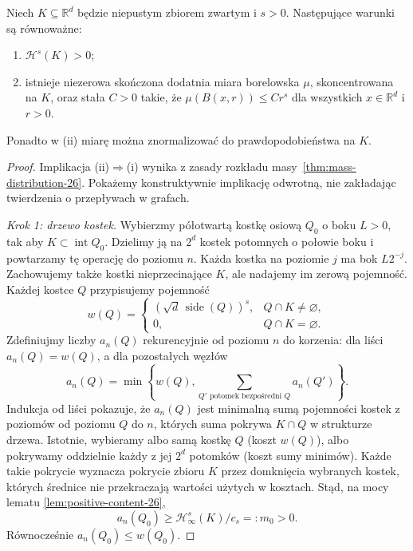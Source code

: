 \begin{twierdzenie}
\label{thm:frostman-26}
Niech $K\subseteq\mathbb R^d$ będzie niepustym
zbiorem zwartym i $s>0$. Następujące warunki
są równoważne:
\begin{enumerate}[label=(\roman*)]
 \item $\mathcal H^s(K)>0$;
 \item istnieje niezerowa skończona dodatnia miara
 borelowska $\mu$, skoncentrowana na $K$, oraz stała
 $C>0$ takie, że
 $\mu(B(x,r))\le Cr^s$ dla wszystkich
 $x\in\mathbb R^d$ i $r>0$.
\end{enumerate}
Ponadto w (ii) miarę można znormalizować do
prawdopodobieństwa na $K$.
\end{twierdzenie}
\begin{proof}
Implikacja (ii)$\Rightarrow$(i) wynika z zasady
rozkładu masy~\ref{thm:mass-distribution-26}.
Pokażemy konstruktywnie implikację odwrotną, nie
zakładając twierdzenia o przepływach w grafach.

\emph{Krok 1: drzewo kostek.} Wybierzmy półotwartą
kostkę osiową $Q_0$ o boku $L>0$, tak aby
$K\subset\operatorname{int}Q_0$. Dzielimy ją na
$2^d$ kostek potomnych o połowie boku i powtarzamy
tę operację do poziomu $n$. Każda kostka na poziomie
$j$ ma bok $L2^{-j}$. Zachowujemy także kostki
nieprzecinające $K$, ale nadajemy im zerową pojemność.
Każdej kostce $Q$ przypisujemy pojemność
\[
 w(Q)=\begin{cases}
 (\sqrt d\,\operatorname{side}(Q))^s,&Q\cap K\ne\varnothing,\\
 0,&Q\cap K=\varnothing.
 \end{cases}
\]
Zdefiniujmy liczby $a_n(Q)$ rekurencyjnie od poziomu
$n$ do korzenia: dla liści $a_n(Q)=w(Q)$, a dla
pozostałych węzłów
\begin{equation}\label{eq:frostman-recursion-26}
 a_n(Q)=\min\left\{w(Q),\sum_{Q'\text{ potomek bezpośredni }Q}
 a_n(Q')\right\}.
\end{equation}
Indukcja od liści pokazuje, że $a_n(Q)$ jest minimalną
sumą pojemności kostek z poziomów od poziomu $Q$
do $n$, których suma pokrywa $K\cap Q$ w strukturze
drzewa. Istotnie, wybieramy albo samą kostkę $Q$
(koszt $w(Q)$), albo pokrywamy oddzielnie każdy z jej
$2^d$ potomków (koszt sumy minimów). Każde takie
pokrycie wyznacza pokrycie zbioru $K$ przez domknięcia
wybranych kostek, których średnice nie przekraczają
wartości użytych w kosztach. Stąd, na mocy lematu
\ref{lem:positive-content-26},
\begin{equation}\label{eq:frostman-positive-26}
 a_n(Q_0)\ge\mathcal H^s_\infty(K)/c_s=:m_0>0.
\end{equation}
Równocześnie $a_n(Q_0)\le w(Q_0)$.


\end{proof}
